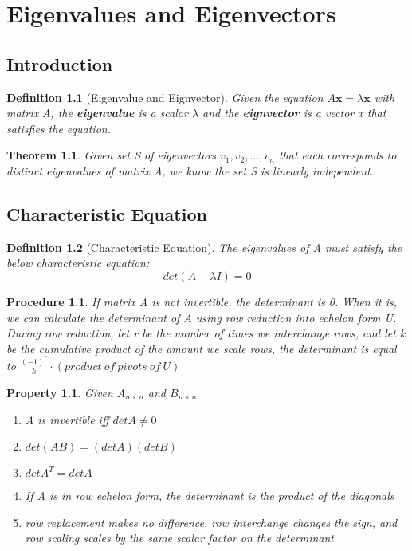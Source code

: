 \documentclass[12pt]{report}
\newtheorem{thm}{Theorem}
\newtheorem{dfn}{Definition}
\newtheorem{proc}{Procedure}
\newtheorem{prop}{Property}
\newcommand{\mtx}[3]{$#1_{#2\times #3}$}
\begin{document}
\chapter{Eigenvalues and Eigenvectors}

\section{Introduction}

\begin{dfn}[Eigenvalue and Eignvector]
Given the equation $A\bm{x}=\lambda \bm{x}$ with matrix A, the \textbf{eigenvalue} is a scalar $\lambda$ and the \textbf{eignvector} is a vector x that satisfies the equation.
\end{dfn}

\begin{thm}
Given set S of eigenvectors $v_1, v_2, \ldots, v_n$ that each corresponds to distinct eigenvalues of matrix A, we know the set S is linearly independent.
\end{thm}

\section{Characteristic Equation}

\begin{dfn}[Characteristic Equation]
The eigenvalues of A must satisfy the below characteristic equation:
\begin{equation}
det(A - \lambda I) = 0
\end{equation}
\end{dfn}

\begin{proc}
If matrix A is not invertible, the determinant is 0. When it is, we can calculate the determinant of A using row reduction into echelon form U. During row reduction, let r be the number of times we interchange rows, and let k be the cumulative product of the amount we scale rows, the determinant is equal to $\frac{(-1)^r}{k}\cdot (product\:of\:pivots\:of\:U)$
\end{proc}

\begin{prop}
Given \mtx{A}{n}{n} and \mtx{B}{n}{n}
\begin{enumerate}
\item A is invertible iff $detA \neq 0$
\item $det(AB) = (detA)(detB)$
\item $det A^T = det A$
\item If A is in row echelon form, the determinant is the product of the diagonals
\item row replacement makes no difference, row interchange changes the sign, and row scaling scales by the same scalar factor on the determinant
\end{enumerate}
\end{prop}
\end{document}
